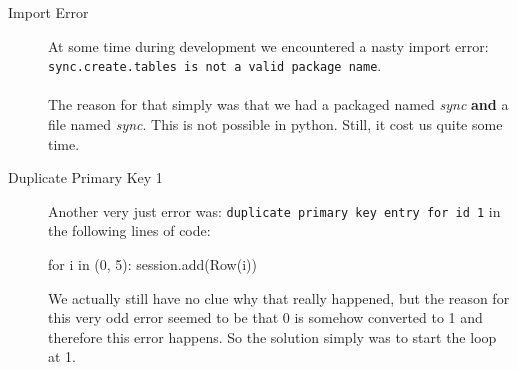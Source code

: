 \documentclass[11pt, a4paper]{article}
\begin{document}
\begin{description}

	\item[Import Error] At some time during development we encountered a nasty import error: \lstinline|sync.create.tables is not a valid package name|. 
	\\\\
	The reason for that simply was that we had a packaged named \textit{sync} \textbf{and} a file named \textit{sync}. This is not possible in python. Still, it cost us quite some time.
	
	\item[Duplicate Primary Key 1] Another very just error was: \lstinline|duplicate primary key entry for id 1| in the following lines of code:
	
	\begin{python}
	for i in (0, 5):
		session.add(Row(i))\end{python} 
	\vspace{10pt}
	
	We actually still have no clue why that really happened, but the reason for this very odd error seemed to be that 0 is somehow converted to 1 and therefore this error happens. So the solution simply was to start the loop at 1.
	
\end{description}

\nocite{*}


\end{document}
